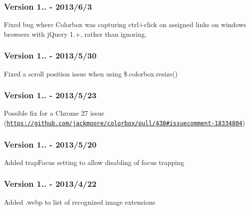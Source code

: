 \subsubsection*{Version 1.. -\/ 2013/6/3}


\begin{DoxyItemize}
\item Fixed bug where Colorbox was capturing ctrl+click on assigned links on windows browsers with j\-Query 1.+, rather than ignoring.
\end{DoxyItemize}

\subsubsection*{Version 1.. -\/ 2013/5/30}


\begin{DoxyItemize}
\item Fixed a scroll position issue when using \$.colorbox.\-resize()
\end{DoxyItemize}

\subsubsection*{Version 1.. -\/ 2013/5/23}


\begin{DoxyItemize}
\item Possible fix for a Chrome 27 issue (\href{https://github.com/jackmoore/colorbox/pull/438#issuecomment-18334804}{\tt https\-://github.\-com/jackmoore/colorbox/pull/438\#issuecomment-\/18334804})
\end{DoxyItemize}

\subsubsection*{Version 1.. -\/ 2013/5/20}


\begin{DoxyItemize}
\item Added trap\-Focus setting to allow disabling of focus trapping
\end{DoxyItemize}

\subsubsection*{Version 1.. -\/ 2013/4/22}


\begin{DoxyItemize}
\item Added .webp to list of recognized image extensions
\end{DoxyItemize}


